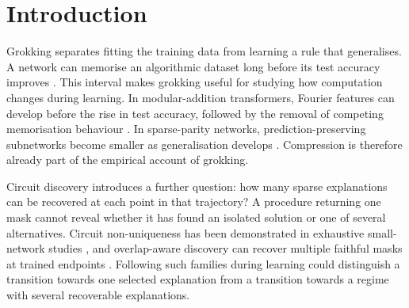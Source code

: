 \begin{abstract}
When a model learns to generalise, does its behaviour become recoverable from one sparse circuit or from several? We follow five one-layer transformers through grokking on modular addition, searching at seven fixed checkpoints and evaluating every candidate over all 12,769 inputs. At 99\% agreement with the full model, greedy search retains 510--515 of 516 components in the delayed phase and 65--146 after stable generalisation. All fifteen stable positions support six or seven sparse masks; none of the twenty earlier positions yields a qualifying mask. A retrospective audit finds ten-member families among independently obtained non-monotone search endpoints at every stable position, without a diversity penalty during search. The original final families contain 27 circuits: none of 4,200 matched random masks reaches their fidelity. Their full neuron intersections are insufficient alone, yet removing them makes every member fail the fidelity criterion. Under calibrated Jensen--Shannon fidelity, stable endpoints retain 209--368 components, compared with 432--515 earlier, and four of fifteen stable positions support sparse families. The original prediction-preserving masks do not meet this stricter criterion. These results connect longitudinal compression to non-unique component realisations: generalisation accompanies a regime of several specific, compact selections that preserve decisions, while the tested searches recover larger masks when preserving output distributions.
\end{abstract}

\section{Introduction}

Grokking separates fitting the training data from learning a rule that generalises. A network can memorise an algorithmic dataset long before its test accuracy improves \citep{power2022grokking}. This interval makes grokking useful for studying how computation changes during learning. In modular-addition transformers, Fourier features can develop before the rise in test accuracy, followed by the removal of competing memorisation behaviour \citep{nanda2023progress}. In sparse-parity networks, prediction-preserving subnetworks become smaller as generalisation develops \citep{merrill2023two}. Compression is therefore already part of the empirical account of grokking.

Circuit discovery introduces a further question: how many sparse explanations can be recovered at each point in that trajectory? A procedure returning one mask cannot reveal whether it has found an isolated solution or one of several alternatives. Circuit non-uniqueness has been demonstrated in exhaustive small-network studies \citep{meloux2025everything}, and overlap-aware discovery can recover multiple faithful masks at trained endpoints \citep{chen2026rome}. Following such families during learning could distinguish a transition towards one selected explanation from a transition towards a regime with several recoverable explanations.

